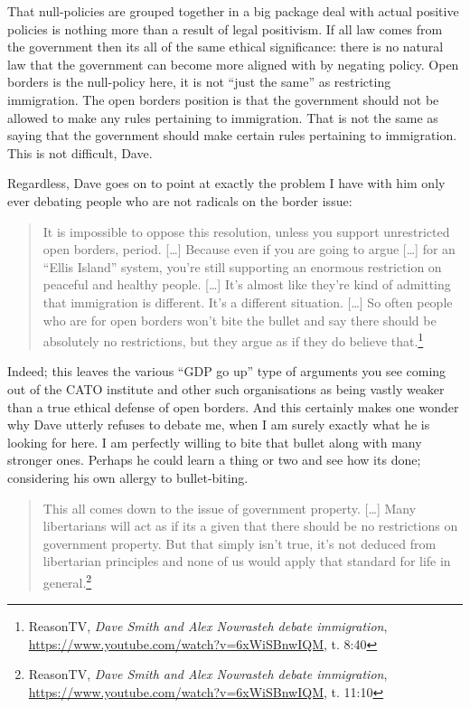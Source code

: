 \documentclass[11pt]{article}
\begin{document}
That null-policies are grouped together in a big package deal with actual positive policies is nothing more than a result of legal positivism. If all law comes from the government then its all of the same ethical significance: there is no natural law that the government can become more aligned with by negating policy. Open borders is the null-policy here, it is not ``just the same'' as restricting immigration. The open borders position is that the government should not be allowed to make any rules pertaining to immigration. That is not the same as saying that the government should make certain rules pertaining to immigration. This is not difficult, Dave.

Regardless, Dave goes on to point at exactly the problem I have with him only ever debating people who are not radicals on the border issue:
\begin{quote}
It is impossible to oppose this resolution, unless you support unrestricted open borders, period. [\ldots{}] Because even if you are going to argue [\ldots{}] for an ``Ellis Island'' system, you're still supporting an enormous restriction on peaceful and healthy people. [\ldots{}] It's almost like they're kind of admitting that immigration is different. It's a different situation. [\ldots{}] So often people who are for open borders won't bite the bullet and say there should be absolutely no restrictions, but they argue as if they do believe that.\footnote{ReasonTV, \emph{Dave Smith and Alex Nowrasteh debate immigration}, \url{https://www.youtube.com/watch?v=6xWiSBnwIQM}, t. 8:40}
\end{quote}

Indeed; this leaves the various ``GDP go up'' type of arguments you see coming out of the CATO institute and other such organisations as being vastly weaker than a true ethical defense of open borders. And this certainly makes one wonder why Dave utterly refuses to debate me, when I am surely exactly what he is looking for here. I am perfectly willing to bite that bullet along with many stronger ones. Perhaps he could learn a thing or two and see how its done; considering his own allergy to bullet-biting.

\begin{quote}
This all comes down to the issue of government property. [\ldots{}] Many libertarians will act as if its a given that there should be no restrictions on government property. But that simply isn't true, it's not deduced from libertarian principles and none of us would apply that standard for life in general.\footnote{ReasonTV, \emph{Dave Smith and Alex Nowrasteh debate immigration}, \url{https://www.youtube.com/watch?v=6xWiSBnwIQM}, t. 11:10}
\end{quote}
\end{document}
